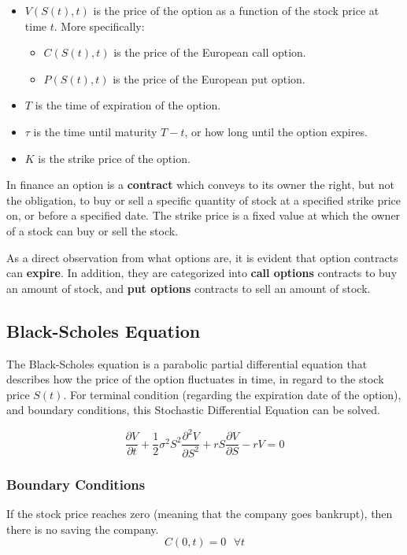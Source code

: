 \begin{itemize}
	\item $V \left( S(t),t \right)$ is the price of the option as a function of the stock price at time $t$. More specifically:
		\begin{itemize}
			\item $C \left( S(t),t \right)$ is the price of the European call option.
			\item $P \left( S(t),t \right)$ is the price of the European put option.
		\end{itemize}
	\item $T$ is the time of expiration of the option.
	\item $\tau$ is the time until maturity $T-t$, or how long until the option expires.
	\item $K$ is the strike price of the option.
\end{itemize}

\begin{remark}
	In finance an option is a \textbf{contract} which conveys to its owner the right, but not the obligation, to buy or sell a specific quantity of stock at a specified strike price on, or before a specified date.
	The strike price is a fixed value at which the owner of a stock can buy or sell the stock.
\end{remark}

As a direct observation from what options are, it is evident that option contracts can \textbf{expire}. In addition, they are categorized into \textbf{call options} contracts to buy an amount of stock, and \textbf{put options} contracts to sell an amount of stock.

\subsection{Black-Scholes Equation}
The Black-Scholes \cite{black1973pricing} equation is a parabolic partial differential equation that describes how the price of the option fluctuates in time, in regard to the stock price $S(t)$. For terminal condition (regarding the expiration date of the option), and boundary conditions, this Stochastic Differential Equation can be solved.

\[ 
	\frac{\partial V}{\partial t} + \frac{1}{2} \sigma^2 S^2 \frac{\partial^2 V}{\partial S^2} + r S \frac{\partial V}{\partial S} - rV = 0
\]

\subsubsection{Boundary Conditions}
\hspace{\parindent}If the stock price reaches zero (meaning that the company goes bankrupt), then there is no saving the company.
\[ 
	C(0,t) = 0 \,\,\,\, \forall t
\]

